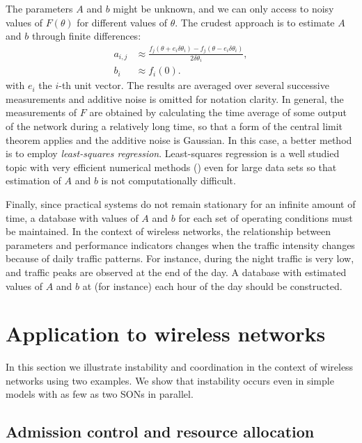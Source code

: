 \documentclass[10pt,conference,letterpaper]{IEEEtran}
\begin{document}
	The parameters $A$ and $b$ might be unknown, and we can only access to noisy values of $F(\theta)$ for different values of $\theta$. The crudest approach is to estimate $A$ and $b$ through finite differences:
	\begin{align}
	a_{i,j} &\approx \frac{ f_j(\theta +  e_i \delta \theta_i) - f_j(\theta -  e_i \delta \theta_i)  }{ 2 \delta \theta_i }, \\
	b_{i} &\approx f_i(0).
	\end{align}
	with $e_i$ the $i$-th unit vector. The results are averaged over several successive measurements and additive noise is omitted for notation clarity. In general, the measurements of $F$ are obtained by calculating the time average of some output of the network during a relatively long time, so that a form of the central limit theorem applies and the additive noise is Gaussian. In this case, a better method is to employ \emph{least-squares regression}. Least-squares regression is a well studied topic  with very efficient numerical methods (\cite{LeastSquaresBjorck}) even for large data sets so that estimation of $A$ and $b$ is not computationally difficult.
	
	Finally, since practical systems do not remain stationary for an infinite amount of time, a database with values of $A$ and $b$ for each set of operating conditions must be maintained. In the context of wireless networks, the relationship between parameters and performance indicators changes when the traffic intensity changes because of daily traffic patterns. For instance, during the night traffic is very low, and traffic peaks are observed at the end of the day. A database with estimated values of $A$ and $b$ at (for instance) each hour of the day should be constructed. 
	
\section{Application to wireless networks}\label{sec:application}
	In this section we illustrate instability and coordination in the context of wireless networks using two examples. We show that instability occurs even in simple models with as few as two \acp{SON} in parallel.
\subsection{Admission control and resource allocation}
\end{document}
